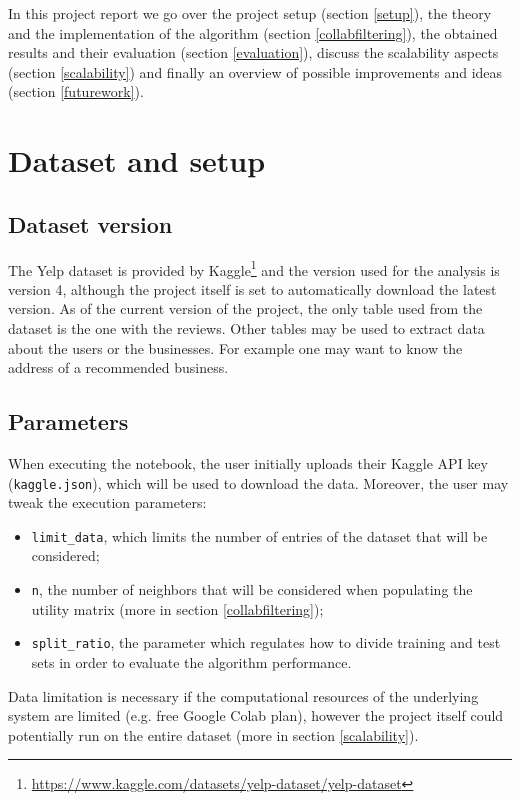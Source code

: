 \documentclass[11pt,a4paper]{article}
\newcommand{\code}{\texttt}
\begin{document}
\begin{multicols}{2}
In this project report we go over the project setup (section \ref{setup}), the theory and the implementation of the algorithm (section \ref{collabfiltering}), the obtained results and their evaluation (section \ref{evaluation}), discuss the scalability aspects (section \ref{scalability}) and finally an overview of possible improvements and ideas (section \ref{futurework}).



\label{setup}
\section{Dataset and setup}


\subsection{Dataset version}
The Yelp dataset is provided by Kaggle\footnote{\url{https://www.kaggle.com/datasets/yelp-dataset/yelp-dataset}} and the version used for the analysis is version 4, although the project itself is set to automatically download the latest version.
As of the current version of the project, the only table used from the dataset is the one with the reviews.
Other tables may be used to extract data about the users or the businesses.
For example one may want to know the address of a recommended business.


\subsection{Parameters}
When executing the notebook, the user initially uploads their Kaggle API key (\verb!kaggle.json!), which will be used to download the data.
Moreover, the user may tweak the execution parameters:
\begin{itemize}
	\item \code{limit\_data}, which limits the number of entries of the dataset that will be considered;
	\item \code{n}, the number of neighbors that will be considered when populating the utility matrix (more in section \ref{collabfiltering});
	\item \code{split\_ratio}, the parameter which regulates how to divide training and test sets in order to evaluate the algorithm performance.
\end{itemize}
Data limitation is necessary if the computational resources of the underlying system are limited (e.g. free Google Colab plan), however the project itself could potentially run on the entire dataset (more in section \ref{scalability}).



\end{multicols}
\end{document}
